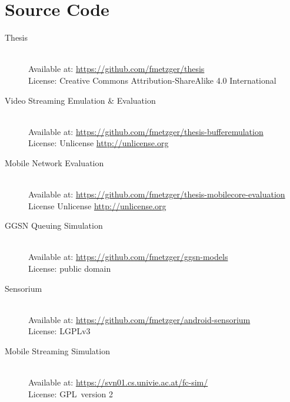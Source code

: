 \chapter*{Source Code}
%

\begin{description}
	\item[Thesis]\hfill \\
	Available at: \url{https://github.com/fmetzger/thesis} \\
	License: Creative Commons Attribution-ShareAlike 4.0 International \cite{ccbysa40}

	\item[Video Streaming Emulation \& Evaluation]\hfill \\
	Available at: \url{https://github.com/fmetzger/thesis-bufferemulation} \\
	License: Unlicense \url{http://unlicense.org}

	\item[Mobile Network Evaluation]\hfill \\
	Available at: \url{https://github.com/fmetzger/thesis-mobilecore-evaluation}  \\
	License Unlicense \url{http://unlicense.org}

	\item[GGSN Queuing Simulation]\hfill \\
	Available at: \url{https://github.com/fmetzger/ggsn-models} \\
	License: public domain

	\item[Sensorium]\hfill \\
	Available at: \url{https://github.com/fmetzger/android-sensorium} \\
	License: \gls{LGPLv3}~\cite{lgplv3}

	\item[Mobile Streaming Simulation]\hfill \\
	Available at: \url{https://svn01.cs.univie.ac.at/fc-sim/}  \\
	License: \gls{GPL}~version 2~\cite{gplv2}

\end{description}